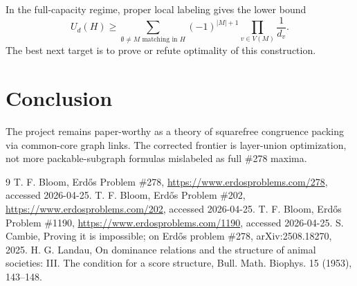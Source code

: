 \documentclass[11pt]{article}
\begin{document}
In the full-capacity regime, proper local labeling gives the lower bound
\[
U_d(H)\ge \sum_{\emptyset\ne M\text{ matching in }H}(-1)^{|M|+1}\prod_{v\in V(M)}\frac1{d_v}.
\]
The best next target is to prove or refute optimality of this construction.

\section{Conclusion}
The project remains paper-worthy as a theory of squarefree congruence packing via common-core graph links. The corrected frontier is layer-union optimization, not more packable-subgraph formulas mislabeled as full \#278 maxima.

\begin{thebibliography}{9}
 T. F. Bloom, Erd\H{o}s Problem \#278, \url{https://www.erdosproblems.com/278}, accessed 2026-04-25.
 T. F. Bloom, Erd\H{o}s Problem \#202, \url{https://www.erdosproblems.com/202}, accessed 2026-04-25.
 T. F. Bloom, Erd\H{o}s Problem \#1190, \url{https://www.erdosproblems.com/1190}, accessed 2026-04-25.
 S. Cambie, Proving it is impossible; on Erd\H{o}s problem \#278, arXiv:2508.18270, 2025.
 H. G. Landau, On dominance relations and the structure of animal societies: III. The condition for a score structure, Bull. Math. Biophys. 15 (1953), 143--148.
\end{thebibliography}
\end{document}
